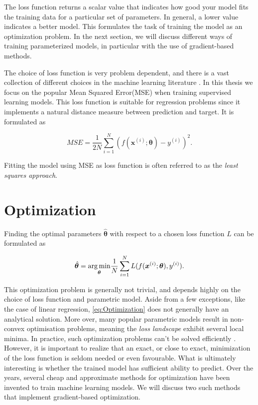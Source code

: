 The loss function returns a scalar value that indicates how good your model fits the training data for a particular set of parameters. In general, a lower value indicates a better model. This formulates the task of training the model as an optimization problem. In the next section, we will discuss different ways of training parameterized models, in particular with the use of gradient-based methods.

The choice of loss function is very problem dependent, and there is a vast collection of different choices in the machine learning literature \citet{hastie01statisticallearning}. In this thesis we focus on the popular Mean Squared Error(MSE) when training supervised learning models. This loss function is suitable for regression problems since it implements a natural distance measure between prediction and target. It is formulated as

\begin{equation}\label{eq:MSE}
    MSE = \frac{1}{2N}\sum_{i=1}^{N} (f(\boldsymbol{x}^{(i)}; \boldsymbol{\theta}) - y^{(i)})^2.
\end{equation}

Fitting the model using MSE as loss function is often referred to as the \emph{least squares approach}.

\section{Optimization}\label{sec:Optimization}
Finding the optimal parameters $\hat{\boldsymbol{\theta}}$ with respect to a chosen loss function $L$ can be formulated as

\begin{equation}\label{eq:Optimization}
    \hat{\boldsymbol{\theta}} = \underset{\boldsymbol{\theta}}{\operatorname*{arg\,min}} \frac{1}{N}\sum_{i=1}^{N} L(f(\boldsymbol{x}^{(i)}; \boldsymbol{\theta}) , y^{(i)}).
\end{equation}

This optimization problem is generally not trivial, and depends highly on the choice of loss function and parametric model. Aside from a few exceptions, like the case of linear regression, \autoref{eq:Optimization} does not generally have an analytical solution. More over, many popular parametric models result in non-convex optimisation problems, meaning the \emph{loss landscape} exhibit several local minima. In practice, such optimization problems can't be solved efficiently \cite{Vava:book}. However, it is important to realize that an exact, or close to exact, minimization of the loss function is seldom needed or even favourable. What is ultimately interesting is whether the trained model has sufficient ability to predict. Over the years, several cheap and approximate methods for optimization have been invented to train machine learning models. We will discuss two such methods that implement gradient-based optimization. 

